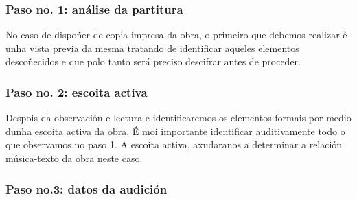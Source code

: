 \begin{multicols}{2}
%
\subsubsection*{Paso no. 1: análise da partitura} 

No caso de dispoñer de copia impresa da obra, o primeiro que debemos realizar é unha vista previa da mesma tratando de identificar aqueles elementos descoñecidos e que polo tanto será preciso descifrar antes de proceder.

\subsubsection*{Paso no. 2: escoita activa} 

Despois da observación e lectura e identificaremos os elementos formais por medio dunha escoita activa da obra.
É moi importante identificar auditivamente todo o que observamos no paso 1.
A escoita activa, axudaranos a determinar a relación música-texto da obra neste caso.

\subsubsection*{Paso no.3: datos da audición} 


\end{multicols}
